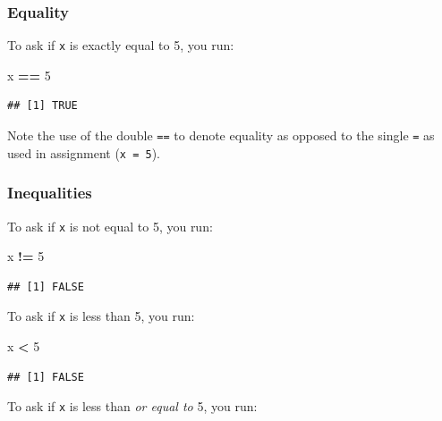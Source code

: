 \documentclass[]{book}
\newenvironment{Shaded}{\begin{snugshade}}{\end{snugshade}}
\newcommand{\DecValTok}[1]{\textcolor[rgb]{0.00,0.00,0.81}{#1}}
\newcommand{\StringTok}[1]{\textcolor[rgb]{0.31,0.60,0.02}{#1}}
\newcommand{\OperatorTok}[1]{\textcolor[rgb]{0.81,0.36,0.00}{\textbf{#1}}}
\newcommand{\NormalTok}[1]{#1}
\theoremstyle{definition}
\theoremstyle{definition}
\theoremstyle{definition}
\theoremstyle{remark}
\begin{document}
\subsubsection*{Equality}\label{equality}

To ask if \texttt{x} is exactly equal to 5, you run:

\begin{Shaded}
\begin{Highlighting}[]
\NormalTok{x }\OperatorTok{==}\StringTok{ }\DecValTok{5}
\end{Highlighting}
\end{Shaded}

\begin{verbatim}
## [1] TRUE
\end{verbatim}

Note the use of the double \texttt{==} to denote equality as opposed to
the single \texttt{=} as used in assignment (\texttt{x\ =\ 5}).

\subsubsection*{Inequalities}\label{inequalities}

To ask if \texttt{x} is not equal to 5, you run:

\begin{Shaded}
\begin{Highlighting}[]
\NormalTok{x }\OperatorTok{!=}\StringTok{ }\DecValTok{5}
\end{Highlighting}
\end{Shaded}

\begin{verbatim}
## [1] FALSE
\end{verbatim}

To ask if \texttt{x} is less than 5, you run:

\begin{Shaded}
\begin{Highlighting}[]
\NormalTok{x }\OperatorTok{<}\StringTok{ }\DecValTok{5}
\end{Highlighting}
\end{Shaded}

\begin{verbatim}
## [1] FALSE
\end{verbatim}

To ask if \texttt{x} is less than \emph{or equal to} 5, you run:
\end{document}
